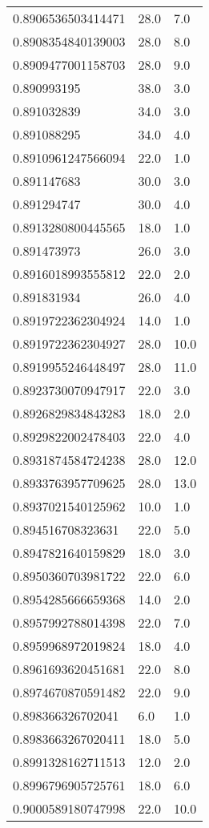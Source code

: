 \begin{center}
\begin{supertabular}[H]{p{0.30\textwidth}p{0.05\textwidth}p{0.05\textwidth}}
0.8906536503414471 & 28.0 & 7.0 \\ 
0.8908354840139003 & 28.0 & 8.0 \\ 
0.8909477001158703 & 28.0 & 9.0 \\ 
0.890993195 & 38.0 & 3.0 \\ 
0.891032839 & 34.0 & 3.0 \\ 
0.891088295 & 34.0 & 4.0 \\ 
0.8910961247566094 & 22.0 & 1.0 \\ 
0.891147683 & 30.0 & 3.0 \\ 
0.891294747 & 30.0 & 4.0 \\ 
0.8913280800445565 & 18.0 & 1.0 \\ 
0.891473973 & 26.0 & 3.0 \\ 
0.8916018993555812 & 22.0 & 2.0 \\ 
0.891831934 & 26.0 & 4.0 \\ 
0.8919722362304924 & 14.0 & 1.0 \\ 
0.8919722362304927 & 28.0 & 10.0 \\ 
0.8919955246448497 & 28.0 & 11.0 \\ 
0.8923730070947917 & 22.0 & 3.0 \\ 
0.8926829834843283 & 18.0 & 2.0 \\ 
0.8929822002478403 & 22.0 & 4.0 \\ 
0.8931874584724238 & 28.0 & 12.0 \\ 
0.8933763957709625 & 28.0 & 13.0 \\ 
0.8937021540125962 & 10.0 & 1.0 \\ 
0.894516708323631 & 22.0 & 5.0 \\ 
0.8947821640159829 & 18.0 & 3.0 \\ 
0.8950360703981722 & 22.0 & 6.0 \\ 
0.8954285666659368 & 14.0 & 2.0 \\ 
0.8957992788014398 & 22.0 & 7.0 \\ 
0.8959968972019824 & 18.0 & 4.0 \\ 
0.8961693620451681 & 22.0 & 8.0 \\ 
0.8974670870591482 & 22.0 & 9.0 \\ 
0.898366326702041 & 6.0 & 1.0 \\ 
0.8983663267020411 & 18.0 & 5.0 \\ 
0.8991328162711513 & 12.0 & 2.0 \\ 
0.8996796905725761 & 18.0 & 6.0 \\ 
0.9000589180747998 & 22.0 & 10.0 \\ 

\end{supertabular}
\end{center}
